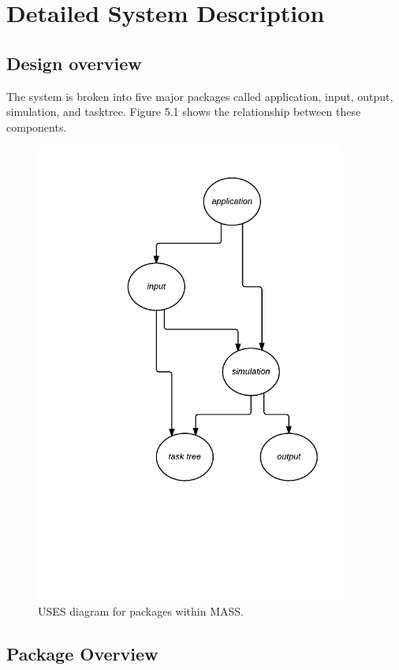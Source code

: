 \chapter{Detailed System Description}\label{detailedSystemDescription}

\section{Design overview}

The system is broken into five major packages called application, input, output, simulation, and tasktree. Figure 5.1 shows the relationship between these components.

\begin{figure}[H]
\centering
\includegraphics[width=4.0in]{figs/UsesDiagram}
\caption{USES diagram for packages within MASS.}
\label{fig:UsesDiagram }
\end{figure}

\section{Package Overview}

